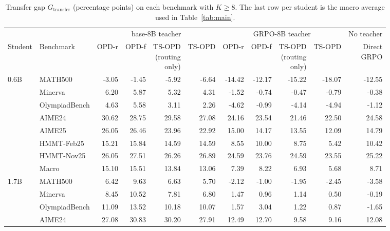 \begin{table}[h]
\centering
\scriptsize
\setlength{\tabcolsep}{3pt}
\caption{Transfer gap $G_{\mathrm{transfer}}$ (percentage points) on each benchmark with $K\ge8$. The last row per student is the macro average used in Table~\ref{tab:main}.}
\label{tab:app-gap}
\setlength{\aboverulesep}{0pt}\setlength{\belowrulesep}{0pt}\renewcommand{\arraystretch}{1.12}
\begin{tabular}{llrrrrrrrr|r}
\toprule
 & & \multicolumn{4}{c}{base-8B teacher} & \multicolumn{4}{c|}{GRPO-8B teacher} & No teacher \\
\cmidrule(lr){3-6}\cmidrule(lr){7-10}
Student & Benchmark & OPD-r & OPD-f & \shortstack{TS-OPD\\(routing\\only)} & TS-OPD & OPD-r & OPD-f & \shortstack{TS-OPD\\(routing\\only)} & TS-OPD & \shortstack{Direct\\GRPO} \\
\midrule
0.6B & MATH500 & -3.05 & -1.45 & -5.92 & -6.64 & -14.42 & -12.17 & -15.22 & -18.07 & -12.55 \\
 & Minerva & 6.20 & 5.87 & 5.32 & 4.31 & -1.52 & -0.74 & -0.47 & -0.79 & -0.38 \\
 & OlympiadBench & 4.63 & 5.58 & 3.11 & 2.26 & -4.62 & -0.99 & -4.14 & -4.94 & -1.12 \\
 & AIME24 & 30.62 & 28.75 & 29.58 & 27.08 & 24.16 & 23.54 & 21.46 & 22.50 & 24.58 \\
 & AIME25 & 26.05 & 26.46 & 23.96 & 22.92 & 15.00 & 14.17 & 13.55 & 12.09 & 14.79 \\
 & HMMT-Feb25 & 15.21 & 15.84 & 14.59 & 14.59 & 8.55 & 10.00 & 8.75 & 5.42 & 10.42 \\
 & HMMT-Nov25 & 26.05 & 27.51 & 26.26 & 26.89 & 24.59 & 23.76 & 24.59 & 23.55 & 25.22 \\
\cmidrule(lr){2-11}
 & Macro & 15.10 & 15.51 & 13.84 & 13.06 & 7.39 & 8.22 & 6.93 & 5.68 & 8.71 \\
\midrule
1.7B & MATH500 & 6.42 & 9.63 & 6.63 & 5.70 & -2.12 & -1.00 & -1.95 & -2.45 & -3.58 \\
 & Minerva & 8.45 & 10.52 & 7.81 & 6.80 & 1.47 & 0.96 & 1.14 & 0.50 & -0.19 \\
 & OlympiadBench & 11.09 & 13.52 & 10.18 & 10.07 & 1.57 & 3.04 & 1.22 & 0.87 & -1.65 \\
 & AIME24 & 27.08 & 30.83 & 30.20 & 27.91 & 12.49 & 12.70 & 9.58 & 9.16 & 12.08 \\

\end{tabular}
\end{table}
